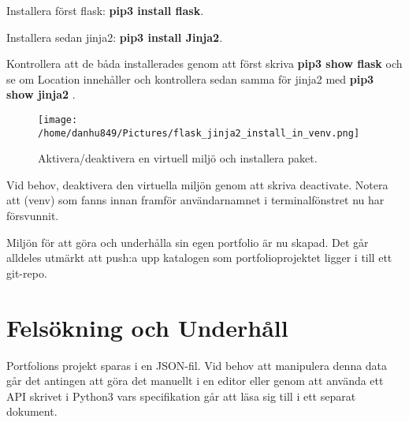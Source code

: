 \documentclass{TDP003mall}
\begin{document}
Installera först flask: \textbf{pip3 install flask}.

Installera sedan jinja2: \textbf{pip3 install Jinja2}.

Kontrollera att de båda installerades genom att först skriva \textbf{pip3 show flask} och se om Location innehåller  och kontrollera sedan samma för jinja2 med \textbf{pip3 show jinja2} .
\begin{figure}[h]
  \centerline{\texttt{[image: /home/danhu849/Pictures/flask\_jinja2\_install\_in\_venv.png]}}
  \caption{Aktivera/deaktivera en virtuell miljö och installera paket.}
  \label{fig}
\end{figure}

Vid behov, deaktivera den virtuella miljön genom att skriva deactivate. Notera att (venv) som fanns innan framför användarnamnet i terminalfönstret nu har försvunnit.

Miljön för att göra och underhålla sin egen portfolio är nu skapad. Det går alldeles utmärkt att push:a upp katalogen som portfolioprojektet ligger i till ett git-repo.


\section{Felsökning och Underhåll}
Portfolions projekt sparas i en JSON-fil. Vid behov att manipulera denna data går det antingen att göra det manuellt i en editor eller genom att använda ett API skrivet i Python3 vars specifikation går att läsa sig till i ett separat dokument.
\end{document}
